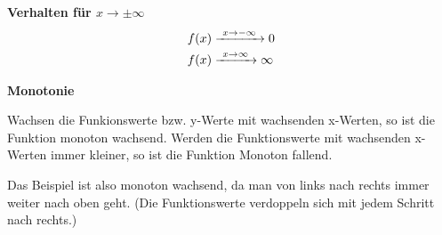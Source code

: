 \begin{tcolorbox}
	\textbf{Verhalten für \(x\rightarrow \pm\infty\)}
	\textcolor{loestc}{
		\begin{align*}
			f(x)&\xrightarrow{\hphantom{\ }x\to-\infty\hphantom{\ }}0\\
			f(x)&\xrightarrow{\hphantom{\ }x\to\infty\hphantom{\ }}\infty
	\end{align*}}
    \vspace{1cm}
\end{tcolorbox}
\begin{tcolorbox}
	\textbf{Monotonie}

	\textcolor{loestc}{Wachsen die Funkionswerte bzw. y-Werte mit wachsenden x-Werten, so ist die Funktion monoton wachsend. Werden die Funktionswerte mit wachsenden x-Werten immer kleiner, so ist die Funktion Monoton fallend.}

	\textcolor{loestc}{Das Beispiel ist also monoton wachsend, da man von links nach rechts immer weiter nach oben geht. (Die Funktionswerte verdoppeln sich mit jedem Schritt nach rechts.)\vspace{3cm}}
\end{tcolorbox}
\newpage
